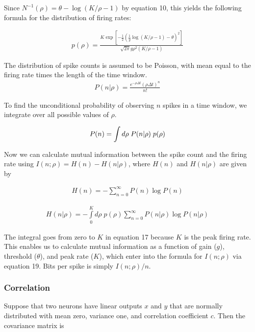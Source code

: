 \documentclass[12pt]{article}
\begin{document}
\noindent Since $\displaystyle N^{-1}(\rho)= \theta - \log(K/\rho-1)$ by equation 10, this yields the following formula for the distribution of firing rates:

\begin{align}
\displaystyle p(\rho) = \frac{K\exp\left[ -\frac{1}{2}\left( \frac{1}{g}\log(K/\rho-1)-\theta\right)^2\right]}{\sqrt{2\pi}g\rho^2(K/\rho-1)} \tag{19}
\end{align}

\noindent The distribution of spike counts is assumed to be Poisson, with mean equal to the firing rate times the length of the time window.
\begin{align}
\displaystyle P(n|\rho) = \frac{e^{-\rho\Delta t}(\rho \Delta t)^n}{n!} \tag{9}
\end{align}

\noindent To find the unconditional probability of observing $n$ spikes in a time window, we integrate over all possible values of $\rho$.

\begin{align}
\displaystyle P(n) =\int d\rho \; P(n|\rho) \; p(\rho) \notag
\end{align}

\noindent Now we can calculate mutual information between the spike count and the firing rate using $I(n;\rho)=H(n)-H(n|\rho)$, where $H(n)$ and $H(n|\rho)$ are given by

\begin{align}
\displaystyle H(n) = -\sum\limits_{n=0}^\infty P(n)\log P(n) \tag{16}
\end{align}

\begin{align}
\displaystyle H(n|\rho) = -\int\limits_0^K d\rho \; p(\rho) \sum\limits_{n=0}^\infty P(n|\rho) \log P(n|\rho) \tag{17}
\end{align}

\noindent The integral goes from zero to $K$ in equation 17 because $K$ is the peak firing rate. This enables us to calculate mutual information as a function of gain ($g$), threshold ($\theta$), and peak rate ($K$), which enter into the formula for $I(n;\rho)$ via equation 19. Bits per spike is simply $I(n;\rho)/n$.

\subsubsection{Correlation}

Suppose that two neurons have linear outputs $x$ and $y$ that are normally distributed with mean zero, variance one, and correlation coefficient $c$. Then the covariance matrix is
\end{document}
